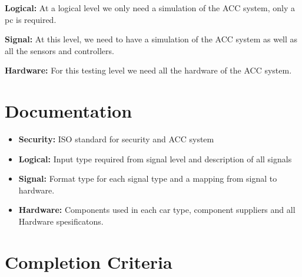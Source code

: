 		{\bf Logical:} At a logical level we only need a simulation of the ACC system, only a pc 
		is required.
				
		{\bf Signal:} At this level, we need to have a simulation of the ACC system as well as all
		the sensors and controllers.

		{\bf Hardware:} For this testing level we need all the hardware of the ACC system.

	\section{Documentation}

		\begin{itemize}
			\item {\bf Security:} ISO standard for security and ACC system
			\item {\bf Logical:} Input type required from signal level and 
			description of all signals
			\item {\bf Signal:} Format type for each signal type and a mapping 
			from signal to hardware.
 			\item {\bf Hardware:} Components used in each car type, component 
 			suppliers and all Hardware spesificatons.
 		\end{itemize}

	\clearpage
	\section{Completion Criteria}

